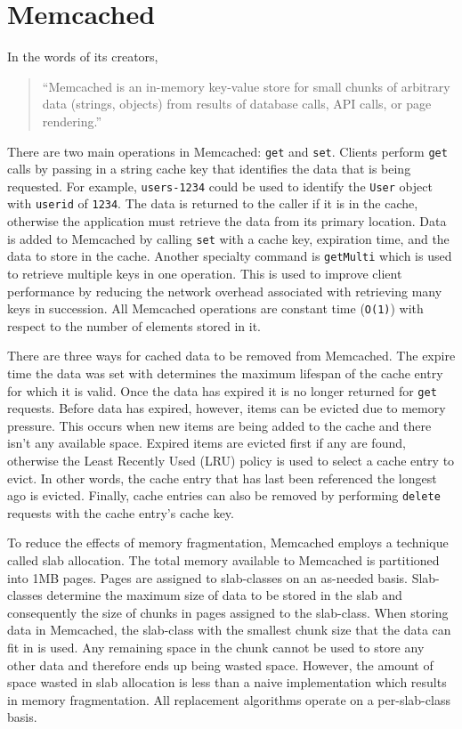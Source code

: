 \documentclass[12pt]{ucthesis}
\begin{document}
\section{Memcached}
In the words of its creators, \begin{quotation}``Memcached is an in-memory key-value store for small chunks of arbitrary data (strings, objects) from results of database calls, API calls, or page rendering\cite{memcachedDotOrg}.''\end{quotation}
There are two main operations in \textsf{Memcached}: {\tt get} and {\tt set}.
Clients perform {\tt get} calls by passing in a string cache key that identifies the data that is being requested.
For example, {\tt users-1234} could be used to identify the {\tt User} object with {\tt userid} of {\tt 1234}.
The data is returned to the caller if it is in the cache, otherwise the application must retrieve the data from its primary location.
Data is added to \textsf{Memcached} by calling {\tt set} with a cache key, expiration time, and the data to store in the cache.
Another specialty command is {\tt getMulti} which is used to retrieve multiple keys in one operation.
This is used to improve client performance by reducing the network overhead associated with retrieving many keys in succession.
All \textsf{Memcached} operations are constant time ({\tt O(1)}) with respect to the number of elements stored in it.

There are three ways for cached data to be removed from \textsf{Memcached}.
The expire time the data was set with determines the maximum lifespan of the cache entry for which it is valid.
Once the data has expired it is no longer returned for {\tt get} requests.
Before data has expired, however, items can be evicted due to memory pressure.
This occurs when new items are being added to the cache and there isn't any available space.
Expired items are evicted first if any are found, otherwise the Least Recently Used (LRU) policy is used to select a cache entry to evict.
In other words, the cache entry that has last been referenced the longest ago is evicted.
Finally, cache entries can also be removed by performing {\tt delete} requests with the cache entry's cache key.

To reduce the effects of memory fragmentation, \textsf{Memcached} employs a technique called slab allocation.
The total memory available to \textsf{Memcached} is partitioned into 1MB pages.
Pages are assigned to slab-classes on an as-needed basis.
Slab-classes determine the maximum size of data to be stored in the slab and consequently the size of chunks in pages assigned to the slab-class.
When storing data in \textsf{Memcached}, the slab-class with the smallest chunk size that the data can fit in is used.
Any remaining space in the chunk cannot be used to store any other data and therefore ends up being wasted space.
However, the amount of space wasted in slab allocation is less than a naive implementation which results in memory fragmentation.
All replacement algorithms operate on a per-slab-class basis.
\end{document}
